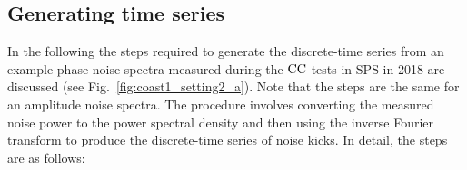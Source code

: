 \subsection{Generating time series}\label{subsec:generatin_noise_kicks}
In the following the steps required to generate the discrete-time series from an example phase noise spectra measured during the ${\mathrm{CC}}$ tests in SPS in 2018 are discussed (see Fig.~\ref{fig:coast1_setting2_a}). Note that the steps are the same for an amplitude noise spectra. The procedure involves converting the measured noise power to the power spectral density and then using the inverse Fourier transform to produce the discrete-time series of noise kicks. In detail, the steps are as follows:


